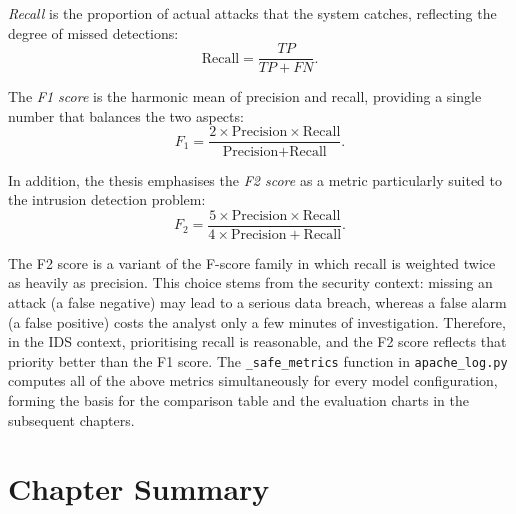 \emph{Recall} is the proportion of actual attacks that the system catches,
reflecting the degree of missed detections:
\begin{equation}
  \text{Recall} = \frac{TP}{TP + FN}.
  \label{eq:recall}
\end{equation}

The \emph{F1 score} is the harmonic mean of precision and recall, providing
a single number that balances the two aspects:
\begin{equation}
  F_1 = \frac{2 \times \text{Precision} \times \text{Recall}}
             {\text{Precision} + \text{Recall}}.
  \label{eq:f1}
\end{equation}

In addition, the thesis emphasises the \emph{F2 score} as a metric
particularly suited to the intrusion detection problem:
\begin{equation}
  F_2 = \frac{5 \times \text{Precision} \times \text{Recall}}
             {4 \times \text{Precision} + \text{Recall}}.
  \label{eq:f2}
\end{equation}

The F2 score is a variant of the F-score family in which recall is weighted
twice as heavily as precision. This choice stems from the security context:
missing an attack (a false negative) may lead to a serious data breach,
whereas a false alarm (a false positive) costs the analyst only a few
minutes of investigation. Therefore, in the IDS context, prioritising
recall is reasonable, and the F2 score reflects that priority better than
the F1 score. The \texttt{\_safe\_metrics} function in
\texttt{apache\_log.py} computes all of the above metrics simultaneously for
every model configuration, forming the basis for the comparison table and
the evaluation charts in the subsequent chapters.

\section{Chapter Summary}
\label{sec:ch2summary}

